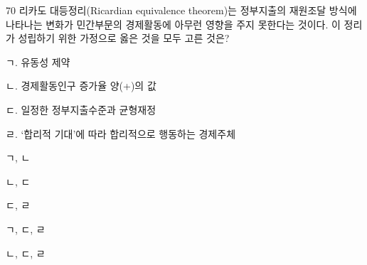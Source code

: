 \begin{question}{70}
리카도 대등정리(Ricardian equivalence theorem)는 정부지출의 재원조달 방식에 나타나는 변화가 민간부문의 경제활동에 아무런 영향을 주지 못한다는 것이다. 이 정리가 성립하기 위한 가정으로 옳은 것을 모두 고른 것은?
\begin{framedtext}
ㄱ. 유동성 제약 \par
ㄴ. 경제활동인구 증가율 양(+)의 값 \par
ㄷ. 일정한 정부지출수준과 균형재정 \par
ㄹ. ‘합리적 기대’에 따라 합리적으로 행동하는 경제주체
\end{framedtext}
\begin{choices}
  \item ㄱ, ㄴ
  \item ㄴ, ㄷ
  \item ㄷ, ㄹ
  \item ㄱ, ㄷ, ㄹ
  \item ㄴ, ㄷ, ㄹ
\end{choices}
\end{question}
